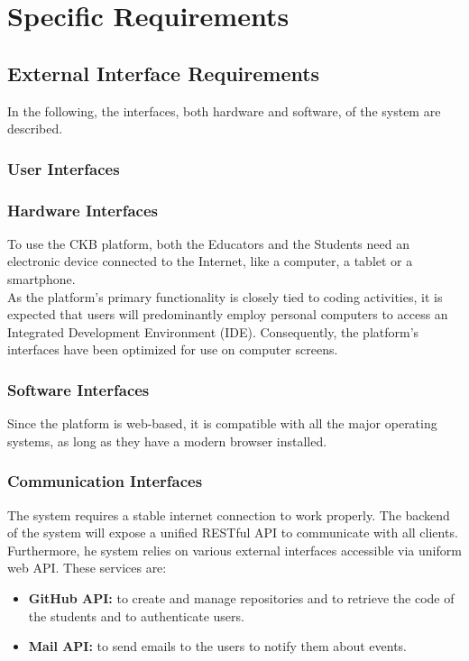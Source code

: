 \chapter{Specific Requirements}

\section{External Interface Requirements}
In the following, the interfaces, both hardware and software, of the system are described.

    {\color{red}\subsection{User Interfaces}}

\subsection{Hardware Interfaces}
To use the CKB platform, both the Educators and the Students need an electronic device connected to the Internet, like a computer, a tablet or a smartphone.\\
As the platform's primary functionality is closely tied to coding activities, it is expected that users will predominantly employ personal computers to access an Integrated Development Environment (IDE). Consequently, the platform's interfaces have been optimized for use on computer screens.\\

\subsection{Software Interfaces}
Since the platform is web-based, it is compatible with all the major operating systems, as long as they have a modern browser installed.

\subsection{Communication Interfaces}
The system requires a stable internet connection to work properly. The backend of the system will expose a unified RESTful API to communicate with all clients.\\
Furthermore, he system relies on various external interfaces accessible via uniform web API. These services are:
\begin{itemize}
    \item \textbf{GitHub API:} to create and manage repositories and to retrieve the code of the students and to authenticate users.
    \item \textbf{Mail API:} to send emails to the users to notify them about events.
\end{itemize}

